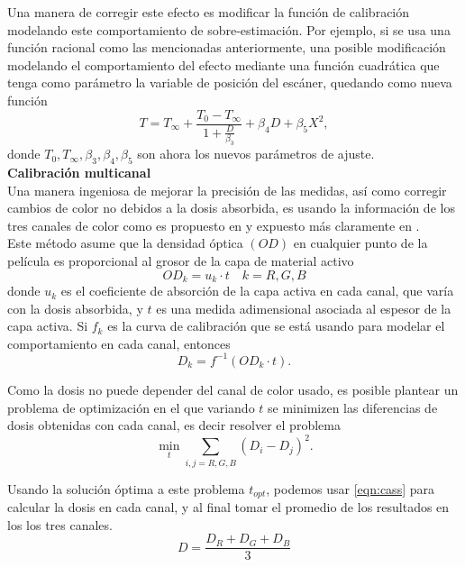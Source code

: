Una manera de corregir este efecto es modificar la función de calibración modelando este comportamiento de sobre-estimación. Por ejemplo, si se usa una función racional como las mencionadas anteriormente, una posible modificación modelando el comportamiento del efecto mediante una función cuadrática que tenga como parámetro la variable de posición del escáner, quedando como nueva función
\begin{equation}
	T=T_{\infty}+\frac{T_0-T_{\infty}}{1+\frac{D}{\beta_{3}}}+\beta_{4}D+\beta_{5}X^2,
\end{equation}
donde $T_0, T_{\infty},\beta_{3},\beta_{4},\beta_{5}$ son ahora los nuevos parámetros de ajuste.\\


\textbf{Calibración multicanal}\\

Una manera ingeniosa de mejorar la precisión de las medidas, así como corregir cambios de color no debidos a la dosis absorbida, es usando la información de los tres canales de color como es propuesto en \cite{Micke2011} y expuesto más claramente en \cite{Li2017}. \\

Este método asume que la densidad óptica $(OD)$ en cualquier punto de la película es proporcional al grosor de la capa de material activo
\begin{equation}
	OD_{k}=u_{k}\cdot t \quad k=R,G,B
\end{equation} 
donde $u_k$ es el coeficiente de absorción de la capa activa en cada canal, que varía con la dosis absorbida, y $t$ es una medida adimensional asociada al espesor de la capa activa. Si $f_k$ es la curva de calibración que se está usando para modelar el comportamiento en cada canal, entonces 
\begin{equation}
\label{eqn:cass}
	D_k=f^{-1}(OD_k\cdot t).
\end{equation}

Como la dosis no puede depender del canal de color usado, es posible plantear un problema de optimización en el que variando $t$ se minimizen las diferencias de dosis obtenidas con cada canal, es decir resolver el problema
\begin{equation}
	\min_{t}\sum_{i,j=R,G,B}(D_i-D_j)^2.
\end{equation}

Usando la solución óptima a este problema $t_{opt}$, podemos usar \eqref{eqn:cass} para calcular la dosis en cada canal, y al final tomar el promedio de los resultados en los los tres canales.
\begin{equation}
	D=\frac{D_R+D_G+D_B}{3}
\end{equation}

